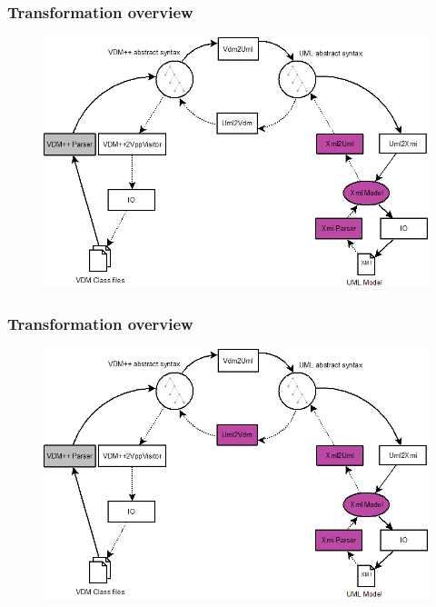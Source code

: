 {
  \frametitle{Transformation overview}
\begin{center}
\begin{figure}
\includegraphics[width=\textwidth]{images/OverviewOverMappingToUML2.png}
\end{figure}
\end{center}
}
%
%
\frame
{
  \frametitle{Transformation overview}
\begin{center}
\begin{figure}
\includegraphics[width=\textwidth]{images/OverviewOverMappingToUML3.png}
\end{figure}
\end{center}
}
%
%
\frame
